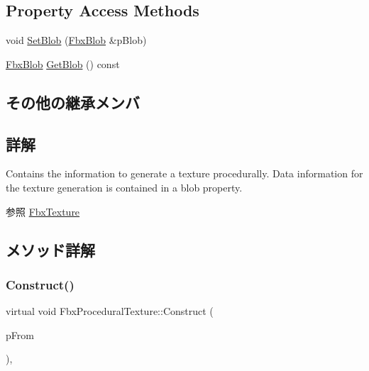 \subsection*{Property Access Methods}
\begin{DoxyCompactItemize}
\item 
void \hyperlink{class_fbx_procedural_texture_a474dd437337ac1f76e7b9c77b7af45ee}{Set\+Blob} (\hyperlink{class_fbx_blob}{Fbx\+Blob} \&p\+Blob)
\item 
\hyperlink{class_fbx_blob}{Fbx\+Blob} \hyperlink{class_fbx_procedural_texture_a89d29f48ef80fa46c0ebb3ade036952a}{Get\+Blob} () const
\end{DoxyCompactItemize}
\subsection*{その他の継承メンバ}


\subsection{詳解}
Contains the information to generate a texture procedurally. Data information for the texture generation is contained in a blob property. \begin{DoxySeeAlso}{参照}
\hyperlink{class_fbx_texture}{Fbx\+Texture} 
\end{DoxySeeAlso}


\subsection{メソッド詳解}
\mbox{\label{class_fbx_procedural_texture_a2386483aef2766c16c911e6fd6539d32}} 
\subsubsection{\texorpdfstring{Construct()}{Construct()}}
{\footnotesize\ttfamily virtual void Fbx\+Procedural\+Texture\+::\+Construct (\begin{DoxyParamCaption}\item[{const \hyperlink{class_fbx_object}{Fbx\+Object} $\ast$}]{p\+From }\end{DoxyParamCaption})\hspace{0.3cm}{\ttfamily [protected]}, {\ttfamily [virtual]}}

